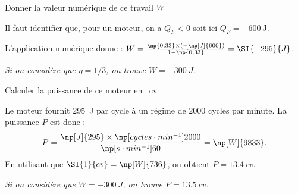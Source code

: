 
\begin{enonce}
	Donner la valeur numérique de ce travail $W$
\end{enonce}


\begin{corrige}
Il faut identifier que, pour un moteur, on a $Q_F<0$ soit ici $Q_F=\SI{-600}{\joule}$. 

L'application numérique donne : $W=\frac{\np{0,33}\times(-\np[J]{600})}{1-\np{0,33}}=\SI{-295}{J}$. 

{\itshape Si on considère que $\eta = 1/3$, on trouve $W= \SI{-300}{J}$.}
\end{corrige}




\begin{enonce}
	Calculer la puissance de ce moteur en \SI{}{cv}
\end{enonce}


\begin{corrige}
Le moteur fournit \SI{295}{J} par cycle à un régime de $2000$ cycles par minute. La puissance $P$ est donc : 
\[
P=\frac{\np[J]{295}\times \np[cycles \cdot min^{-1}]{2000}}{\np[s \cdot min^{-1}]{60}}=\np[W]{9833}.
\]
En utilisant que $\SI{1}{cv}  = \np[W]{736}$, on obtient $P=\SI{13,4}{cv}$.

{\itshape Si on considère que $W= \SI{-300}{J}$, on trouve $P=\SI{13,5}{cv}$.}
\end{corrige}


\finEntrainement










